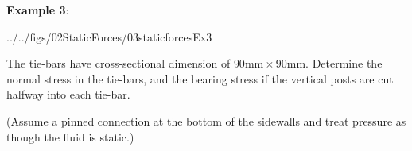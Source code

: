 \documentclass[10pt,onesided]{amsart}
\begin{document}
\newpage

\begin{minipage}{0.4\textwidth}
	\raggedright
	\textbf{Example 3}:\\
	\vspace*{-1cm}
	\begin{cfig}[0.6]{../../figs/02StaticForces/03staticforcesEx3}\end{cfig}
	The tie-bars have cross-sectional dimension of $90\text{mm}\times 90\text{mm}$.
	Determine the normal stress in the tie-bars, and the bearing stress
	if the vertical posts are cut halfway into each tie-bar.		\par
	(Assume a pinned connection at the bottom of the sidewalls and treat pressure as though the fluid is static.)
	\parb
\end{minipage}
\end{document}
